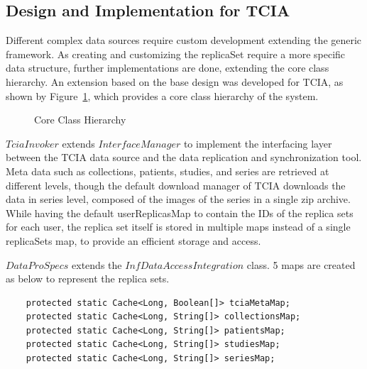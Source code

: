 \documentclass[conference]{IEEEtran}
\begin{document}
\subsection{Design and Implementation for TCIA}
Different complex data sources require custom development extending the generic framework. As creating and customizing the replicaSet require a more specific data structure, further implementations are done, extending the core class hierarchy. An extension based on the base design was developed for TCIA, as shown by Figure~\ref{fig:class}, which provides a core class hierarchy of the system.
\begin{figure}[b]
\begin{center}
\end{center}
 \caption{Core Class Hierarchy}
 \label{fig:class}
\end{figure}

$TciaInvoker$ extends $InterfaceManager$ to implement the interfacing layer between the TCIA data source and the data replication and synchronization tool. Meta data such as collections, patients, studies, and series are retrieved at different levels, though the default download manager of TCIA downloads the data in series level, composed of the images of the series in a single zip archive. While having the default userReplicasMap to contain the IDs of the replica sets for each user, the replica set itself is stored in multiple maps instead of a single replicaSets map, to provide an efficient storage and access.

$DataProSpecs$ extends the $InfDataAccessIntegration$ class. 5 maps are created as below to represent the replica sets.
\begin{lstlisting}  
    protected static Cache<Long, Boolean[]> tciaMetaMap;
    protected static Cache<Long, String[]> collectionsMap;
    protected static Cache<Long, String[]> patientsMap;
    protected static Cache<Long, String[]> studiesMap;
    protected static Cache<Long, String[]> seriesMap;
\end{lstlisting} 
\end{document}
